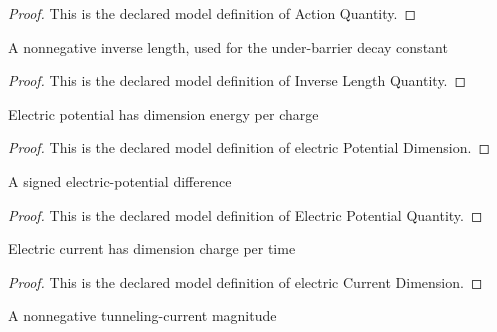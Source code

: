 \begin{proof}
  This is the declared model definition of Action Quantity.
\end{proof}
\begin{definition}
  \label{def:physics:phyx-mini-0616:phyxminiproblems-problemphyxmini0616-inverselengthquantity}
  A nonnegative inverse length, used for the under-barrier decay constant
\end{definition}
\begin{proof}
  This is the declared model definition of Inverse Length Quantity.
\end{proof}
\begin{definition}
  \label{def:physics:phyx-mini-0616:phyxminiproblems-problemphyxmini0616-electricpotentialdimension}
  Electric potential has dimension energy per charge
\end{definition}
\begin{proof}
  This is the declared model definition of electric Potential Dimension.
\end{proof}
\begin{definition}
  \label{def:physics:phyx-mini-0616:phyxminiproblems-problemphyxmini0616-electricpotentialquantity}
  A signed electric-potential difference
\end{definition}
\begin{proof}
  This is the declared model definition of Electric Potential Quantity.
\end{proof}
\begin{definition}
  \label{def:physics:phyx-mini-0616:phyxminiproblems-problemphyxmini0616-electriccurrentdimension}
  Electric current has dimension charge per time
\end{definition}
\begin{proof}
  This is the declared model definition of electric Current Dimension.
\end{proof}
\begin{definition}
  \label{def:physics:phyx-mini-0616:phyxminiproblems-problemphyxmini0616-electriccurrentmagnitude}
  A nonnegative tunneling-current magnitude
\end{definition}
